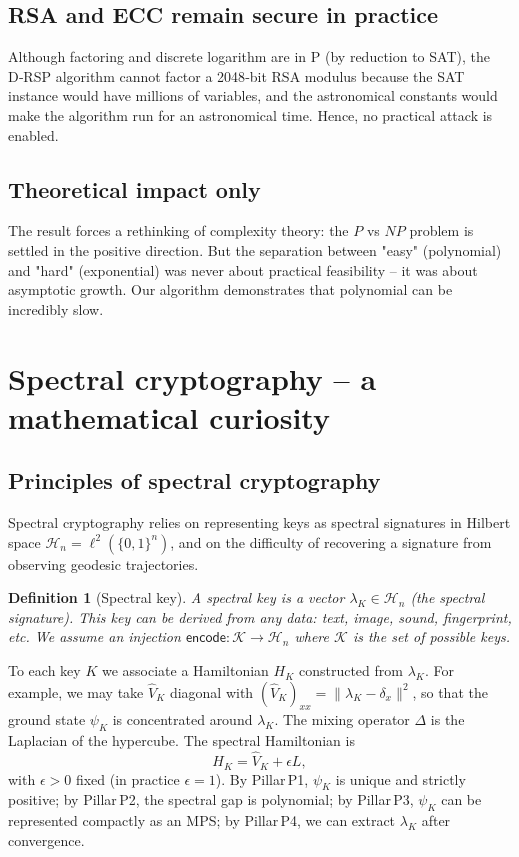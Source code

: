 \documentclass[11pt,a4paper]{article}
\newtheorem{definition}[theorem]{Definition}
\begin{document}
\subsection{RSA and ECC remain secure in practice}

Although factoring and discrete logarithm are in P (by reduction to SAT), the D‑RSP algorithm cannot factor a 2048‑bit RSA modulus because the SAT instance would have millions of variables, and the astronomical constants would make the algorithm run for an astronomical time. Hence, no practical attack is enabled.

\subsection{Theoretical impact only}

The result forces a rethinking of complexity theory: the \(P\) vs \(NP\) problem is settled in the positive direction. But the separation between "easy" (polynomial) and "hard" (exponential) was never about practical feasibility – it was about asymptotic growth. Our algorithm demonstrates that polynomial can be incredibly slow.

\section{Spectral cryptography – a mathematical curiosity}

\subsection{Principles of spectral cryptography}

Spectral cryptography relies on representing keys as spectral signatures in Hilbert space \(\mathcal{H}_n = \ell^2(\{0,1\}^n)\), and on the difficulty of recovering a signature from observing geodesic trajectories.

\begin{definition}[Spectral key]
A spectral key is a vector \(\lambda_K \in \mathcal{H}_n\) (the spectral signature). This key can be derived from any data: text, image, sound, fingerprint, etc. We assume an injection \(\mathsf{encode} : \mathcal{K} \to \mathcal{H}_n\) where \(\mathcal{K}\) is the set of possible keys.
\end{definition}

To each key \(K\) we associate a Hamiltonian \(H_K\) constructed from \(\lambda_K\). For example, we may take \(\hat{V}_K\) diagonal with \((\hat{V}_K)_{xx} = \|\lambda_K - \delta_x\|^2\), so that the ground state \(\psi_K\) is concentrated around \(\lambda_K\). The mixing operator \(\Delta\) is the Laplacian of the hypercube. The spectral Hamiltonian is
\[
H_K = \hat{V}_K + \epsilon L,
\]
with \(\epsilon>0\) fixed (in practice \(\epsilon=1\)). By Pillar P1, \(\psi_K\) is unique and strictly positive; by Pillar P2, the spectral gap is polynomial; by Pillar P3, \(\psi_K\) can be represented compactly as an MPS; by Pillar P4, we can extract \(\lambda_K\) after convergence.
\end{document}
